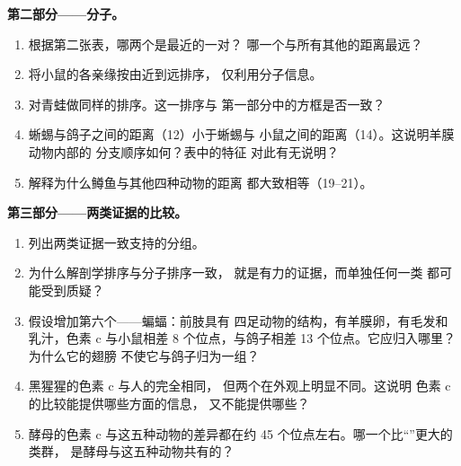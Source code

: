 \begin{problem}
\medskip
\noindent\textbf{第二部分——分子。}
\begin{enumerate}[resume]
  \item 根据第二张表，哪两个是最近的一对？
        哪一个与所有其他的距离最远？
  \item 将小鼠的各亲缘按由近到远排序，
        仅利用分子信息。
  \item 对青蛙做同样的排序。这一排序与
        第一部分中的方框是否一致？
  \item 蜥蜴与鸽子之间的距离（12）小于蜥蜴与
        小鼠之间的距离（14）。这说明羊膜动物内部的
        分支顺序如何？表中的特征
        对此有无说明？
  \item 解释为什么鳟鱼与其他四种动物的距离
        都大致相等（19--21）。
\end{enumerate}

\medskip
\noindent\textbf{第三部分——两类证据的比较。}
\begin{enumerate}[resume]
  \item 列出两类证据一致支持的分组。
  \item 为什么解剖学排序与分子排序一致，
        就是有力的证据，而单独任何一类
        都可能受到质疑？
  \item 假设增加第六个——蝙蝠：前肢具有
        四足动物的结构，有羊膜卵，有毛发和乳汁，色素 c
        与小鼠相差 8 个位点，与鸽子相差
        13 个位点。它应归入哪里？为什么它的翅膀
        不使它与鸽子归为一组？
  \item 黑猩猩的色素 c 与人的完全相同，
        但两个在外观上明显不同。这说明
        色素 c 的比较能提供哪些方面的信息，
        又不能提供哪些？
  \item 酵母的色素 c 与这五种动物的差异都在约 45
        个位点左右。哪一个比“”更大的类群，
        是酵母与这五种动物共有的？
\end{enumerate}


\end{problem}
